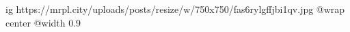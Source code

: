  
 
 
 
 

\ifcmt
  ig https://mrpl.city/uploads/posts/resize/w/750x750/fas6rylgffjbi1qv.jpg
  @wrap center
  @width 0.9
\fi
